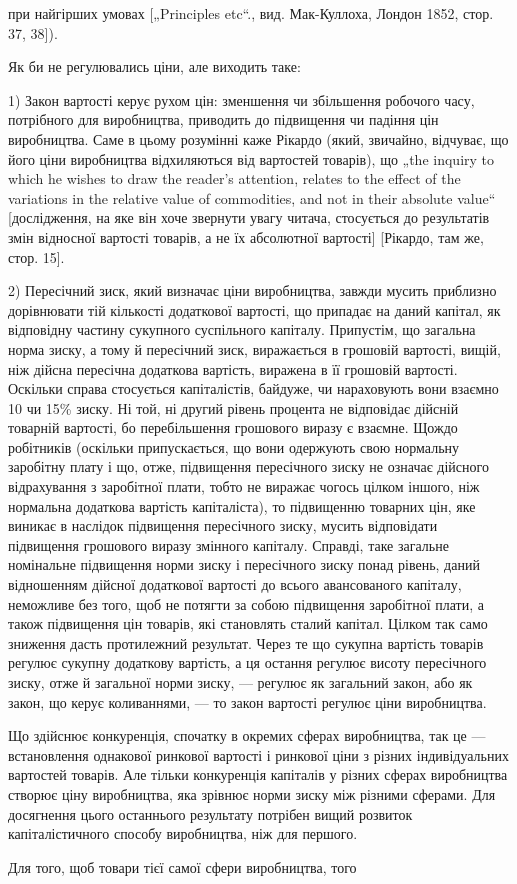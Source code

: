 при найгірших умовах [„Principles etc“., вид. Мак-Куллоха, Лондон
1852, стор. 37, 38]).

Як би не регулювались ціни, але виходить таке:

1) Закон вартості керує рухом цін: зменшення чи збільшення
робочого часу, потрібного для виробництва, приводить до підвищення
чи падіння цін виробництва. Саме в цьому розумінні
каже Рікардо (який, звичайно, відчуває, що його ціни виробництва
відхиляються від вартостей товарів), що „the inquiry to
which he wishes to draw the reader’s attention, relates to the effect
of the variations in the relative value of commodities, and not in
their absolute value“ [дослідження, на яке він хоче звернути увагу
читача, стосується до результатів змін відносної вартості товарів,
а не їх абсолютної вартості] [Рікардо, там же, стор. 15].

2) Пересічний зиск, який визначає ціни виробництва, завжди
мусить приблизно дорівнювати тій кількості додаткової вартості,
що припадає на даний капітал, як відповідну частину сукупного
суспільного капіталу. Припустім, що загальна норма
зиску, а тому й пересічний зиск, виражається в грошовій вартості,
вищій, ніж дійсна пересічна додаткова вартість, виражена в її
грошовій вартості. Оскільки справа стосується капіталістів, байдуже,
чи нараховують вони взаємно 10 чи 15\% зиску. Ні той,
ні другий рівень процента не відповідає дійсній товарній вартості,
бо перебільшення грошового виразу є взаємне. Щождо
робітників (оскільки припускається, що вони одержують свою
нормальну заробітну плату і що, отже, підвищення пересічного
зиску не означає дійсного відрахування з заробітної плати,
тобто не виражає чогось цілком іншого, ніж нормальна додаткова
вартість капіталіста), то підвищенню товарних цін, яке
виникає в наслідок підвищення пересічного зиску, мусить відповідати
підвищення грошового виразу змінного капіталу. Справді,
таке загальне номінальне підвищення норми зиску і пересічного
зиску понад рівень, даний відношенням дійсної додаткової
вартості до всього авансованого капіталу, неможливе без того,
щоб не потягти за собою підвищення заробітної плати, а також
підвищення цін товарів, які становлять сталий капітал. Цілком
так само зниження дасть протилежний результат. Через те що
сукупна вартість товарів регулює сукупну додаткову вартість,
а ця остання регулює висоту пересічного зиску, отже й загальної
норми зиску, — регулює як загальний закон, або як закон, що
керує коливаннями, — то закон вартості регулює ціни виробництва.

Що здійснює конкуренція, спочатку в окремих сферах виробництва,
так це — встановлення однакової ринкової вартості
і ринкової ціни з різних індивідуальних вартостей товарів. Але
тільки конкуренція капіталів у різних сферах виробництва створює
ціну виробництва, яка зрівнює норми зиску між різними сферами.
Для досягнення цього останнього результату потрібен вищий
розвиток капіталістичного способу виробництва, ніж для першого.

Для того, щоб товари тієї самої сфери виробництва, того

